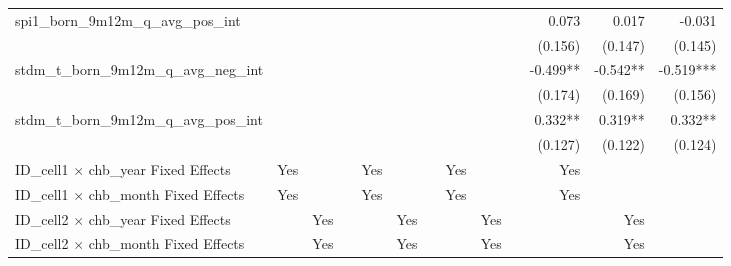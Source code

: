 \begin{tabular}{lrrrrrrrrrrrr}
spi1\_born\_9m12m\_q\_avg\_pos\_int         &              &              &              &              &              &              &              &              &              &        0.073 &        0.017 &       -0.031 \\ 
                                            &              &              &              &              &              &              &              &              &              &      (0.156) &      (0.147) &      (0.145) \\ 
stdm\_t\_born\_9m12m\_q\_avg\_neg\_int      &              &              &              &              &              &              &              &              &              &     -0.499** &     -0.542** &    -0.519*** \\ 
                                            &              &              &              &              &              &              &              &              &              &      (0.174) &      (0.169) &      (0.156) \\ 
stdm\_t\_born\_9m12m\_q\_avg\_pos\_int      &              &              &              &              &              &              &              &              &              &      0.332** &      0.319** &      0.332** \\ 
                                            &              &              &              &              &              &              &              &              &              &      (0.127) &      (0.122) &      (0.124) \\ 
\midrule
ID\_cell1 $\times$ chb\_year Fixed Effects  &          Yes &              &              &          Yes &              &              &          Yes &              &              &          Yes &              &              \\ 
ID\_cell1 $\times$ chb\_month Fixed Effects &          Yes &              &              &          Yes &              &              &          Yes &              &              &          Yes &              &              \\ 
ID\_cell2 $\times$ chb\_year Fixed Effects  &              &          Yes &              &              &          Yes &              &              &          Yes &              &              &          Yes &              \\ 
ID\_cell2 $\times$ chb\_month Fixed Effects &              &          Yes &              &              &          Yes &              &              &          Yes &              &              &          Yes &              \\ 

\end{tabular}

